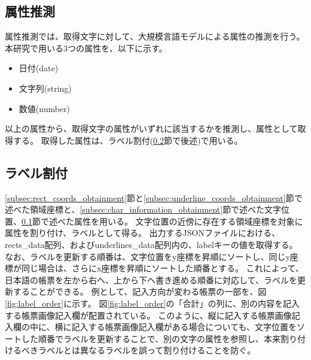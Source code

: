 \subsection{属性推測}\label{subsec:att_prediction}
属性推測では、取得文字に対して、大規模言語モデルによる属性の推測を行う。
本研究で用いる3つの属性を、以下に示す。

\begin{itemize}
    \item 日付(date)
    \item 文字列(string)
    \item 数値(number)
\end{itemize}

以上の属性から、取得文字の属性がいずれに該当するかを推測し、属性として取得する。
取得した属性は、ラベル割付(\ref{subsec:label_link}節で後述)で用いる。

\subsection{ラベル割付}\label{subsec:label_link}
\ref{subsec:rect_coords_obtainment}節と\ref{subsec:underline_coords_obtainment}節で述べた領域座標と、\ref{subsec:char_information_obtainment}節で述べた文字位置、\ref{subsec:att_prediction}節で述べた属性を用いる。
文字位置の近傍に存在する領域座標を対象に属性を割り付け、ラベルとして得る。
出力するJSONファイルにおける、rects\_data配列、およびunderlines\_data配列内の、labelキーの値を取得する。
なお、ラベルを更新する順番は、文字位置をy座標を昇順にソートし、同じy座標が同じ場合は、さらにx座標を昇順にソートした順番とする。
これによって、日本語の帳票を左から右へ、上から下へ書き進める順番に対応して、ラベルを更新することができる。
例として、記入方向が変わる帳票の一部を、図\ref{fig:label_order}に示す。
図\ref{fig:label_order}の「合計」の列に、別の内容を記入する帳票画像記入欄が配置されている。
このように、縦に記入する帳票画像記入欄の中に、横に記入する帳票画像記入欄がある場合についても、文字位置をソートした順番でラベルを更新することで、別の文字の属性を参照し、本来割り付けるべきラベルとは異なるラベルを誤って割り付けることを防ぐ。

